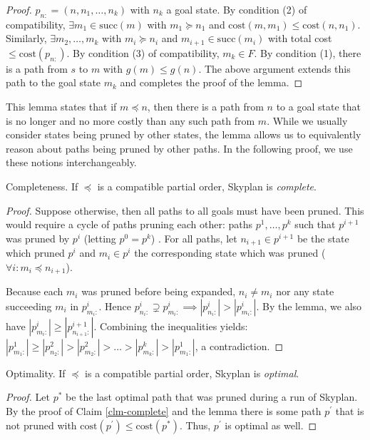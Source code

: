 \documentclass[letterpaper]{article}
\theoremstyle{plain} \newtheorem{theorem}{Theorem} \newtheorem{proposition}{Proposition} \newtheorem{lemma}{Lemma}
\theoremstyle{definition} \newtheorem{definition}{Definition} \newtheorem{conjecture}{Conjecture} \newtheorem*{example}{Example}
\theoremstyle{remark} \newtheorem*{remark}{Remark} \newtheorem*{note}{Note} \newtheorem{case}{Case}
\begin{document}
\begin{proof}
$p_{n:}=(n,n_{1},\dots,n_{k})$ with $n_{k}$ a goal state.
By condition (2) of compatibility, $\exists m_{1} \in \mathrm{succ}(m)$ 
with $m_{1} \succeq n_{1}$ and $\mathrm{cost}(m,m_{1}) \leq \mathrm{cost}(n,n_{1})$. 
Similarly, $\exists m_{2},\dots,m_{k}$ with 
$m_{i} \succeq n_{i}$ and $m_{i+1} \in \mathrm{succ}(m_{i})$ with 
total cost $\leq \mathrm{cost}(p_{n:})$.
By condition (3) of compatibility, $m_{k} \in F$. By condition (1),
there is a path from $s$ to $m$ with $g(m) \leq g(n)$. The above argument extends this path
to the goal state $m_{k}$ and completes the proof of the lemma.
\end{proof}

This lemma states that if $m \preceq n$, then there is a path from $n$ to a goal
state that is no longer and no more costly than any such path from $m$.
While we usually consider states being pruned by other states, the lemma
allows us to equivalently reason about paths being pruned by other paths.
In the following proof, we use these notions interchangeably.


\begin{claim}{Completeness.}\label{clm-complete}
   If $\preceq$ is a compatible partial order, Skyplan
is \emph{complete}.
\end{claim}
\begin{proof}
Suppose otherwise, then all paths to all goals must
have been pruned. This would require a cycle of paths pruning each other: 
paths $p^{1},\dots,p^{k}$ such that $p^{i+1}$ was pruned by $p^{i}$ (letting $p^{0}=p^{k}$) .
For all paths, let $n_{i+1} \in p^{i+1}$ be the state which pruned $p^{i}$ and
$m_{i} \in p^{i}$ the corresponding state which was pruned 
($\forall i: m_{i} \preceq n_{i+1}$).

Because each $m_{i}$ was pruned before being expanded,
$n_{i} \neq m_{i}$ nor any state succeeding $m_{i}$ in $p^{i}_{m_{i}:}$.
Hence $p^{i}_{n_{i}:} \supsetneq p^{i}_{m_{i}:} \implies |p^{i}_{n_{i}:}| > |p^{i}_{m_{i}:}|$.
By the lemma, we also have %
 $|p^{i}_{m_{i}:}| \geq |p^{i+1}_{n_{i+1}:}|$. Combining the
inequalities yields: $|p^{1}_{m_{1}:}| \geq |p^{2}_{n_{2}:}| > |p^{2}_{m_{2}:}| > \dots > |p^{k}_{m_{k}:}| > |p^{1}_{m_{1}:}|$, 
a contradiction.
\end{proof}
  
\begin{claim}{Optimality.}\label{clm-optimal}
   If $\preceq$ is a compatible partial order, Skyplan
is \emph{optimal}.
\end{claim}
\begin{proof} 
Let $p^{*}$ be the last optimal path that was pruned during a run of Skyplan. 
By the proof of Claim \ref{clm-complete} and the lemma 
there is some path $p^\prime$ that is not pruned with
$\mathrm{cost}(p^\prime) \leq \mathrm{cost}(p^{*})$.
Thus, $p^\prime$ is optimal as well.
\end{proof}
\end{document}
